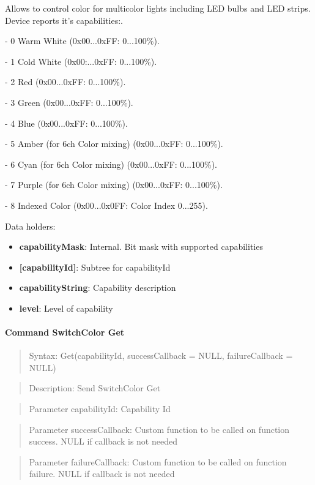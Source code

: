 Allows to control color for multicolor lights including LED bulbs and LED strips. Device reports it's capabilities:. 

- 0 Warm White (0x00...0xFF: 0...100\%). 

- 1 Cold White (0x00:...0xFF: 0...100\%). 

- 2 Red (0x00...0xFF: 0...100\%). 

- 3 Green (0x00...0xFF: 0...100\%). 

- 4 Blue (0x00...0xFF: 0...100\%). 

- 5 Amber (for 6ch Color mixing) (0x00...0xFF: 0...100\%). 

- 6 Cyan (for 6ch Color mixing) (0x00...0xFF: 0...100\%). 

- 7 Purple (for 6ch Color mixing) (0x00...0xFF: 0...100\%). 

- 8 Indexed Color (0x00...0x0FF: Color Index 0...255).
\newline

\noindent
Data holders:

\begin{itemize}
\item \textbf{capabilityMask}: Internal. Bit mask with supported capabilities
\item \textbf{[capabilityId]}: Subtree for capabilityId
\item \qquad\textbf{capabilityString}: Capability description
\item \qquad\textbf{level}: Level of capability
\end{itemize}

\paragraph{Command SwitchColor Get}
\begin{quote}Syntax: Get(capabilityId, successCallback = NULL, failureCallback = NULL)\end{quote}
\begin{quote}Description: Send SwitchColor Get\end{quote}
\begin{quote}Parameter capabilityId: Capability Id\end{quote}
\begin{quote}Parameter successCallback: Custom function to be called on function success. NULL if callback is not needed\end{quote}
\begin{quote}Parameter failureCallback: Custom function to be called on function failure. NULL if callback is not needed\end{quote}


